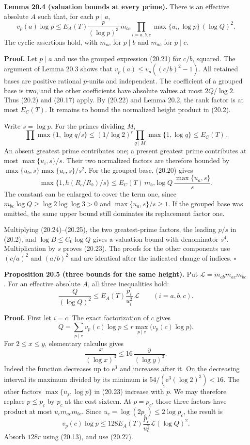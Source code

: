 \documentclass[
  11pt,
  a4paper,
]{article}
\begin{document}
\textbf{Lemma 20.4 (valuation bounds at every prime).} There is an
effective absolute \(A\) such that, for each \(p\mid a\), \[
 v_p(a)\log p
 \le E_A(T)\frac p{(\log p)^3}\,
          m_{bc}\prod_{i=a,b,c}\max\{u_i,\log p\}\,(\log Q)^2.
 \tag{20.23}
\] The cyclic assertions hold, with \(m_{ac}\) for \(p\mid b\) and
\(m_{ab}\) for \(p\mid c\).

\textbf{Proof.} Let \(p\mid a\) and use the grouped expression (20.21)
for \(c/b\), squared. The argument of Lemma 20.3 shows that
\(v_p(a)\le v_p((c/b)^2-1)\). All retained bases are positive rational
\(p\)-units and independent. The coefficient of a grouped base is two,
and the other coefficients have absolute values at most \(2Q/\log2\).
Thus (20.2) and (20.17) apply. By (20.22) and Lemma 20.2, the rank
factor is at most \(E_C(T)\). It remains to bound the normalized height
product in (20.2).

Write \(s=\log p\). For the primes dividing \(M\), \[
 \prod \max\{1,\log q/s\}
 \le (1/\log2)^r\prod_{q\mid M}\max\{1,\log q\}
 \le E_C(T).
 \tag{20.24}
\] An absent greatest prime contributes one; a present greatest prime
contributes at most \(\max\{u_i,s\}/s\). Their two normalized factors
are therefore bounded by \(\max\{u_b,s\}\max\{u_c,s\}/s^2\). For the
grouped base, (20.20) gives \[
 \max\{1,h(R_c/R_b)/s\}
 \le E_C(T)\,m_{bc}\log Q\,\frac{\max\{u_a,s\}}s.
 \tag{20.25}
\] The constant can be enlarged to cover the term one, since
\(m_{bc}\log Q\ge\log2\log\log3>0\) and \(\max\{u_a,s\}/s\ge1\). If the
grouped base was omitted, the same upper bound still dominates its
replacement factor one.

Multiplying (20.24)--(20.25), the two greatest-prime factors, the
leading \(p/s\) in (20.2), and \(\log B\le C_0\log Q\) gives a valuation
bound with denominator \(s^4\). Multiplication by \(s\) proves (20.23).
The proofs for the other components use \((c/a)^2\) and \((a/b)^2\) and
are identical after the indicated change of indices. \(\square\)

\textbf{Proposition 20.5 (three bounds for the same height).} Put
\(\mathcal L=m_{ab}m_{ac}m_{bc}\). For an effective absolute \(A\), all
three inequalities hold: \[
 \frac Q{(\log Q)^2}
 \le E_A(T)\frac{p_i}{u_i^2}\,\mathcal L
                 \qquad(i=a,b,c).
 \tag{20.26}
\]

\textbf{Proof.} First let \(i=c\). The exact factorization of \(c\)
gives \[
 Q=\sum_{p\mid c}v_p(c)\log p
       \le r\max_{p\mid c}\bigl(v_p(c)\log p\bigr).
 \tag{20.27}
\] For \(2\le x\le y\), elementary calculus gives \[
 \frac{x}{(\log x)^3}\le16\,\frac{y}{(\log y)^3}.
 \tag{20.28}
\] Indeed the function decreases up to \(\mathrm e^3\) and increases
after it. On the decreasing interval its maximum divided by its minimum
is \(54/(\mathrm e^3(\log2)^3)<16\). The other factors
\(\max\{u_j,\log p\}\) in (20.23) increase with \(p\). We may therefore
replace \(p\le p_c\) by \(p_c\) at the cost sixteen. At \(p=p_c\), those
three factors have product at most \(u_c m_{ac}m_{bc}\). Since
\(u_c=\log(2p_c)\le2\log p_c\), the result is \[
 v_p(c)\log p\le
 128 E_A(T)\frac{p_c}{u_c^2}\mathcal L(\log Q)^2.
 \] Absorb \(128r\) using (20.13), and use (20.27).
\end{document}
